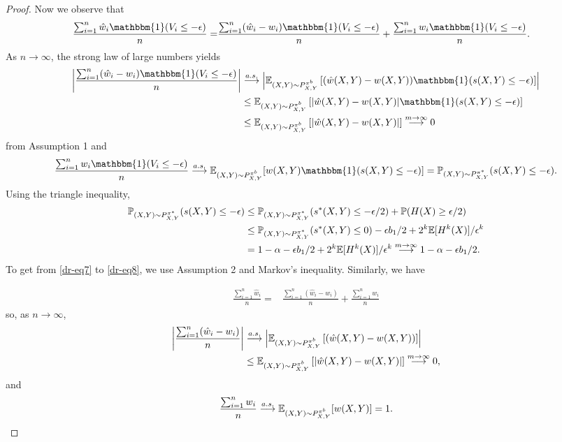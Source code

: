 \begin{proof}
Now we observe that
\begin{align}
    \frac{\sum_{i=1}^n \hat{w}_i \mathbbm{1}(V_i \leq - \epsilon) }{n} =& \frac{\sum_{i=1}^n (\hat{w}_i - w_i) \mathbbm{1}(V_i \leq - \epsilon) }{n} + \frac{\sum_{i=1}^n w_i \mathbbm{1}(V_i \leq - \epsilon) }{n}. \nonumber
\end{align}
As $n\rightarrow \infty$, the strong law of large numbers yields
\begin{align}
    \left| \frac{\sum_{i=1}^n (\hat{w}_i - w_i) \mathbbm{1}(V_i \leq - \epsilon) }{n}\right| &\overset{a.s.}{\longrightarrow} \left|\expb\left[ (\hat{w}(X, Y) - w(X,Y))\mathbbm{1}(s(X,Y) \leq -\epsilon)\right]\right| \nonumber \\
    &\leq \expb\left[ |\hat{w}(X, Y) - w(X,Y)|\mathbbm{1}(s(X,Y) \leq -\epsilon)\right] \nonumber \\
    &\leq \expb\left[ |\hat{w}(X, Y) - w(X,Y)|\right] \overset{m \rightarrow \infty}{\longrightarrow} 0
\end{align}
from Assumption 1 and
\begin{align}
    \frac{\sum_{i=1}^n w_i \mathbbm{1}(V_i \leq - \epsilon) }{n} \overset{a.s.}{\longrightarrow} \expb[w(X,Y) \mathbbm{1}(s(X,Y) \leq -\epsilon)] = \tarprob(s(X,Y) \leq -\epsilon).
\end{align}
Using the triangle inequality,
\begin{align}
    \mathbb{P}_{(X,Y)\sim P^{\pi^*}_{X,Y}}(s(X,Y) \leq -\epsilon) &\leq \mathbb{P}_{(X,Y)\sim P^{\pi^*}_{X,Y}}(s^*(X,Y) \leq -\epsilon/2) + \mathbb{P}(H(X) \geq \epsilon/2) \label{dr-eq7} \\
    &\leq \mathbb{P}_{(X,Y)\sim P^{\pi^*}_{X,Y}}(s^*(X,Y) \leq 0) - \epsilon b_1/2 + 2^k\mathbb{E}[H^k(X)]/\epsilon^k \label{dr-eq8} \\
    &= 1- \alpha - \epsilon b_1/2 + 2^k\mathbb{E}[H^k(X)]/\epsilon^k \overset{m \rightarrow \infty}{\longrightarrow} 1- \alpha - \epsilon b_1/2. \nonumber
\end{align}
To get from \eqref{dr-eq7} to \eqref{dr-eq8}, we use Assumption 2 and Markov's inequality. Similarly, we have

\begin{align}
    \frac{\sum_{i=1}^n \hat{w}_i}{n} =& \frac{\sum_{i=1}^n (\hat{w}_i - w_i)}{n} + \frac{\sum_{i=1}^n w_i }{n} \nonumber
\end{align}
so, as $n \rightarrow \infty$, 
\begin{align}
    \left| \frac{\sum_{i=1}^n (\hat{w}_i - w_i) }{n}\right| &\overset{a.s.}{\longrightarrow} \left|\mathbb{E}_{(X,Y)\sim P^{\pi^b}_{X,Y}}\left[ (\hat{w}(X, Y) - w(X,Y))\right]\right| \nonumber\\
    &\leq \mathbb{E}_{(X,Y)\sim P^{\pi^b}_{X,Y}}\left[ |\hat{w}(X, Y) - w(X,Y)|\right] \overset{m \rightarrow \infty}{\longrightarrow} 0,
\end{align}
and
\begin{align}
    \frac{\sum_{i=1}^n w_i }{n} \overset{a.s.}{\longrightarrow} \mathbb{E}_{(X,Y)\sim P^{\pi^b}_{X,Y}}[w(X,Y)] = 1.
\end{align}


\end{proof}
